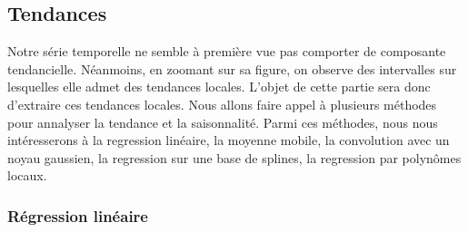 \documentclass[
]{article}
\begin{document}
\hypertarget{tendances}{%
\subsection{Tendances}\label{tendances}}

Notre série temporelle ne semble à première vue pas comporter de
composante tendancielle. Néanmoins, en zoomant sur sa figure, on observe
des intervalles sur lesquelles elle admet des tendances locales. L'objet
de cette partie sera donc d'extraire ces tendances locales. Nous allons
faire appel à plusieurs méthodes pour annalyser la tendance et la
saisonnalité. Parmi ces méthodes, nous nous intéresserons à la
regression linéaire, la moyenne mobile, la convolution avec un noyau
gaussien, la regression sur une base de splines, la regression par
polynômes locaux.

\hypertarget{ruxe9gression-linuxe9aire}{%
\subsubsection{Régression linéaire}\label{ruxe9gression-linuxe9aire}}
\end{document}
